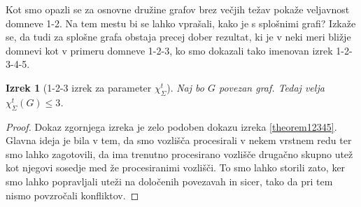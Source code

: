 \documentclass[12pt,a4paper,twoside]{article}
\theoremstyle{definition} %
\theoremstyle{plain} %
\newtheorem{izrek}[definicija]{Izrek}
\newcommand{\ect}{\chi_{\Sigma}^t}
\numberwithin{equation}{section}  %
\begin{document}
Kot smo opazli se za osnovne družine grafov brez večjih težav pokaže veljavnost domneve 1-2. Na tem mestu bi se lahko vprašali, kako je s splošnimi grafi? Izkaže se, da tudi za splošne grafa obstaja precej dober rezultat, ki je v neki meri bližje domnevi kot v primeru domneve 1-2-3, ko smo dokazali tako imenovan izrek 1-2-3-4-5.
\begin{izrek}[1-2-3 izrek za parameter $\ect$]
\label{theorem123}
Naj bo $G$ povezan graf. Tedaj velja $\ect(G) \le 3$.
 \end{izrek}

\begin{proof}
Dokaz zgornjega izreka je zelo podoben dokazu izreka \ref{theorem12345}. Glavna ideja je bila v tem, da smo vozlišča procesirali v nekem vrstnem redu ter smo lahko zagotovili, da ima trenutno procesirano vozlišče drugačno skupno utež kot njegovi sosedje med že procesiranimi vozlišči. To smo lahko storili zato, ker smo lahko popravljali uteži na določenih povezavah in sicer, tako da pri tem nismo povzročali konfliktov.


\end{proof}
\end{document}
